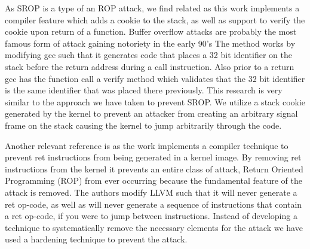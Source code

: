 \documentclass{sig-alternate-05-2015}
\begin{document}
\par As SROP is a type of an ROP attack, we find \cite{cowan1998stackguard}
related as this work implements a compiler feature which adds a cookie to the stack, 
as well as support to verify the cookie upon return of a function.  Buffer overflow 
attacks are probably the most famous form of attack gaining notoriety in the early 90's
The method works by modifying gcc such that it generates code that places a
32 bit identifier on the stack before the return address during a call instruction.
Also prior to a return gcc has the function call a verify method which validates 
that the 32 bit identifier is the same identifier that was placed there previously.
This research is very similar to the approach we have taken to prevent SROP.  
We utilize a stack cookie generated by the kernel to prevent an attacker from 
creating an arbitrary signal frame on the stack causing the kernel to jump arbitrarily 
through the code.

\par Another relevant reference is \cite{li2010defeating} as the work implements a 
compiler technique to prevent ret instructions from being generated in a kernel image. 
By removing ret instructions from the kernel it prevents an entire class of attack, 
Return Oriented Programming (ROP) from ever occurring because the fundamental feature 
of the attack is removed. The authors modify LLVM such that it will never generate a ret 
op-code, as well as will never generate a sequence of instructions that contain a ret op-code, 
if you were to jump between instructions. Instead of developing a technique to systematically 
remove the necessary elements for the attack we have used a hardening technique to 
prevent the attack.


%
%
\end{document}
